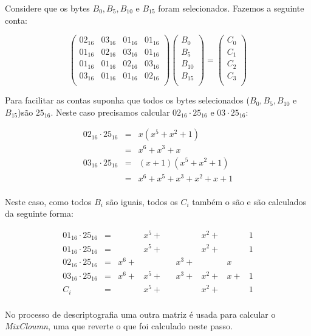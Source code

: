 \begin{example}
  Considere que os bytes $B_0, B_5, B_{10}$ e $B_{15}$ foram selecionados.
  Fazemos a seguinte conta:

\begin{displaymath}
\left(\begin{array}{cccc}
02_{16} & 03_{16} & 01_{16} & 01_{16} \\
01_{16} & 02_{16} & 03_{16} & 01_{16} \\
01_{16} & 01_{16} & 02_{16} & 03_{16} \\
03_{16} & 01_{16} & 01_{16} & 02_{16} \\
\end{array} \right) 
\left( \begin{array}{c}
B_0\\ B_5\\ B_{10}\\ B_{15}\\\end{array} \right)
=
\left( \begin{array}{c}
C_0\\ C_1\\ C_2\\ C_3\\\end{array} \right)
\end{displaymath}  

Para facilitar as contas suponha que todos os bytes selecionados ($B_0, B_5, B_{10}$ e $B_{15}$)são $25_{16}$.
Neste caso precisamos calcular $02_{16} \cdot 25_{16}$ e $03 \cdot 25_{16}$:


\begin{eqnarray*}
  02_{16} \cdot 25_{16} & = & x(x^5 + x^2 + 1)\\
                      & = & x^6 + x^3 + x\\
  03_{16} \cdot 25_{16} & = & (x + 1)(x^5 + x^2 + 1)\\ 
                      & = & x^6 + x^5 + x^3 + x^2 + x + 1\\ 
\end{eqnarray*}

Neste caso, como todos $B_i$ são iguais, todos os $C_i$ também o são e são calculados da seguinte forma:

\begin{displaymath}
  \begin{array}{cccccccccc}
    01_{16} \cdot 25_{16} & = & & x^5 + & & & x^2 + & & 1\\
    01_{16} \cdot 25_{16} & = & & x^5 + & & & x^2 + & & 1\\
    02_{16} \cdot 25_{16} & = & x^6 + & & & x^3 + & & x & \\
    03_{16} \cdot 25_{16} & = & x^6 + & x^5 + & & x^3 + & x^2 + & x + & 1\\
    \hline
    C_i & = & & x^5 + & & & x^2 + &  & 1\\
  \end{array}
\end{displaymath}
\end{example}

No processo de descriptografia uma outra matriz é usada para calcular o {\em MixCloumn}, uma que reverte o que foi calculado neste passo.
